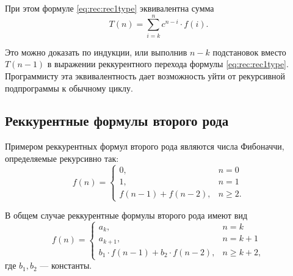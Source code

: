 При этом формуле \eqref{eq:rec:rec1type} эквивалентна сумма
\begin{equation}
    \label{eq:rec:rec1typeSum}
    T(n)=\sum_{i=k}^{n}c^{n-i}\cdot f(i).
\end{equation}

Это можно доказать по индукции, или выполнив $n-k$ подстановок вместо $T(n-1)$ в выражении реккурентного перехода формулы \eqref{eq:rec:rec1type}. Программисту эта эквивалентность дает возможность уйти от рекурсивной подпрограммы к обычному циклу.


\subsection{Реккурентные формулы второго рода}

Примером реккурентных формул второго рода являются числа Фибоначчи, определяемые рекурсивно так:
\begin{equation}
    \label{eq:rec:fibonacci}
    f(n)=
    \begin{cases}
        0,              &n=0\\
        1,              &n=1\\
        f(n-1)+f(n-2),  &n\geq 2.
    \end{cases}
\end{equation}

В общем случае реккурентные формулы второго рода имеют вид
\begin{equation}
    f(n)=
    \begin{cases}
        a_{k},                          &n=k\\
        a_{k+1},                        &n=k+1\\
        b_1\cdot f(n-1)+b_2\cdot f(n-2),&n\geq k+2,
    \end{cases}
\end{equation}
где $b_1,b_2$ --- константы.

